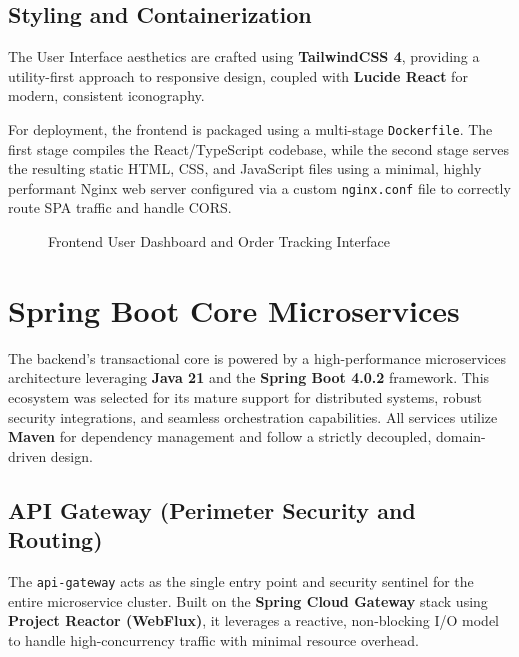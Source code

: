 \documentclass[12pt,a4paper]{report}
\begin{document}
\subsection{Styling and Containerization}
The User Interface aesthetics are crafted using \textbf{TailwindCSS 4}, providing a utility-first approach to responsive design, coupled with \textbf{Lucide React} for modern, consistent iconography. 

For deployment, the frontend is packaged using a multi-stage \texttt{Dockerfile}. The first stage compiles the React/TypeScript codebase, while the second stage serves the resulting static HTML, CSS, and JavaScript files using a minimal, highly performant Nginx web server configured via a custom \texttt{nginx.conf} file to correctly route SPA traffic and handle CORS.

\begin{figure}[H]
    \centering
    \vspace{6cm} %
    \caption{Frontend User Dashboard and Order Tracking Interface}
\end{figure}

\section{Spring Boot Core Microservices}
The backend's transactional core is powered by a high-performance microservices architecture leveraging \textbf{Java 21} and the \textbf{Spring Boot 4.0.2} framework. This ecosystem was selected for its mature support for distributed systems, robust security integrations, and seamless orchestration capabilities. All services utilize \textbf{Maven} for dependency management and follow a strictly decoupled, domain-driven design.

\subsection{API Gateway (Perimeter Security and Routing)}
The \texttt{api-gateway} acts as the single entry point and security sentinel for the entire microservice cluster. Built on the \textbf{Spring Cloud Gateway} stack using \textbf{Project Reactor (WebFlux)}, it leverages a reactive, non-blocking I/O model to handle high-concurrency traffic with minimal resource overhead.
\end{document}
